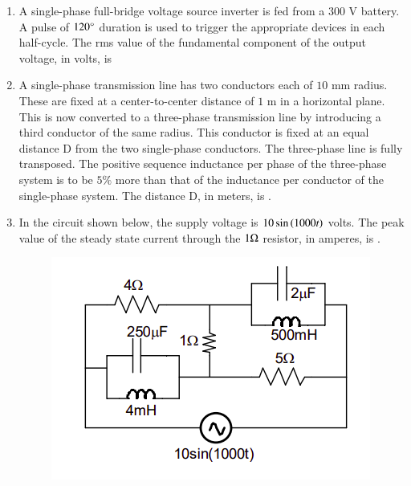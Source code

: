 \documentclass[journal,12pt,onecolumn]{IEEEtran}
\theoremstyle{remark}
\begin{document}
\begin{enumerate}[start=1, label=Q.\arabic*]
    \item A single-phase full-bridge voltage source inverter  is fed from a $300$ V battery. A pulse of $120\degree$ duration is used to trigger the appropriate devices in each half-cycle. The rms value of the fundamental component of the output voltage, in volts, is
    \begin{enumerate}
    \end{enumerate}

    \hfill{}

    \item A single-phase transmission line has two conductors each of $10$ mm radius. These are fixed at a center-to-center distance of $1$ m in a horizontal plane. This is now converted to a three-phase transmission line by introducing a third conductor of the same radius. This conductor is fixed at an equal distance D from the two single-phase conductors. The three-phase line is fully transposed. The positive sequence inductance per phase of the three-phase system is to be $5\%$ more than that of the inductance per conductor of the single-phase system. The distance D, in meters, is \underline{\hspace{2cm}}.

    \hfill{}

    \item In the circuit shown below, the supply voltage is $10 \sin\left(1000t\right)$ volts. The peak value of the steady state current through the $1\ohm$ resistor, in amperes, is \underline{\hspace{2cm}}.
    \begin{figure}[H]
        \includegraphics[width=0.6\columnwidth]{Figures/q52.png}
        \centering
        \caption{}
    \end{figure}


\end{enumerate}
\end{document}
